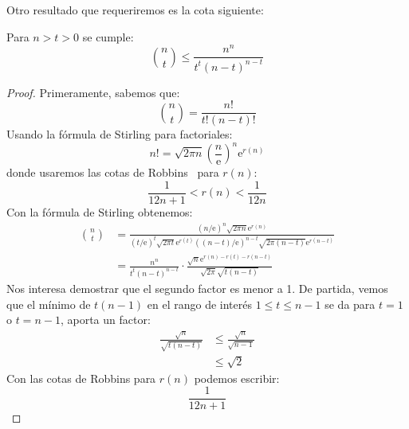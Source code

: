   Otro resultado que requeriremos es la cota siguiente:
  \begin{lemma}
    \label{lem:binomial}
    Para \(n > t > 0\) se cumple:
    \begin{equation*}
      \binom{n}{t}
        \le \frac{n^n}{t^t (n - t)^{n - t}}
    \end{equation*}
  \end{lemma}
  \begin{proof}
    Primeramente,
    sabemos que:
    \begin{equation*}
      \binom{n}{t}
        = \frac{n!}{t! (n - t)!}
    \end{equation*}
    Usando la fórmula de Stirling
    para factoriales:
    \begin{equation}
      \label{eq:Stirling}
      n!
        = \sqrt{ 2 \pi n}
             \left( \frac{n}{\mathrm{e}} \right)^n
             \mathrm{e}^{r(n)}
    \end{equation}
    donde usaremos las cotas de Robbins~%
      \cite{robbins55:_remark_Stirlings_formula}
    para \(r(n)\):
    \begin{equation}
      \label{eq:Robbins}
      \frac{1}{12 n + 1}
        < r(n)
        < \frac{1}{12 n}
    \end{equation}
    Con la fórmula de Stirling obtenemos:
    \begin{align*}
      \binom{n}{t}
        &= \frac{(n / \mathrm{e})^n \sqrt{2 \pi n} \mathrm{e}^{r(n)}}
                {(t / \mathrm{e})^t \sqrt{2 \pi t} \mathrm{e}^{r(t)}
                 ((n - t) / \mathrm{e})^{n - t}
                   \sqrt{2 \pi (n - t)} \mathrm{e}^{r(n - t)}} \\
        &= \frac{n^n}{t^t (n - t)^{n - t}}
             \cdot \frac{\sqrt{n} \mathrm{e}^{r(n) - r(t) - r(n - t)}}
                        {\sqrt{2 \pi} \sqrt{t (n - t)}}
    \end{align*}
    Nos interesa demostrar que el segundo factor es menor a \num{1}.
    De partida,
    vemos que el mínimo de \(t (n - 1)\)
    en el rango de interés \(1 \le t \le n - 1\)
    se da para \(t = 1\) o \(t = n - 1\),
    aporta un factor:
    \begin{align*}
      \frac{\sqrt{n}}{\sqrt{t (n - t)}}
        &\le \frac{\sqrt{n}}{\sqrt{n - 1}} \\
        &\le \sqrt{2}
    \end{align*}
    Con las cotas de Robbins para \(r(n)\) podemos escribir:
    \begin{equation*}
      \frac{1}{12 n + 1}

\end{equation*}
\end{proof}
